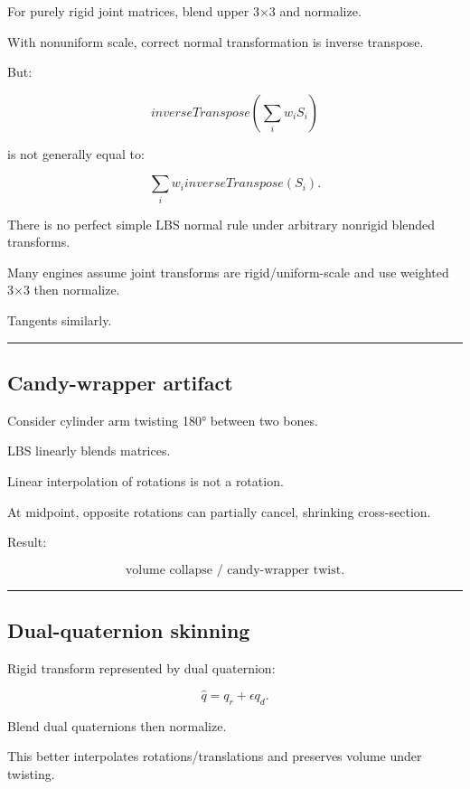 For purely rigid joint matrices, blend upper 3×3 and normalize.

With nonuniform scale, correct normal transformation is inverse transpose.

But:

\[
inverseTranspose
\left(
\sum_iw_iS_i
\right)
\]

is not generally equal to:

\[
\sum_iw_i
inverseTranspose(S_i).
\]

There is no perfect simple LBS normal rule under arbitrary nonrigid blended transforms.

Many engines assume joint transforms are rigid/uniform-scale and use weighted 3×3 then normalize.

Tangents similarly.

\begin{center}\rule{0.5\linewidth}{0.5pt}\end{center}

\subsection{Candy-wrapper artifact}\label{04-visual-computing-ii-ch041-candy-wrapper-artifact}

Consider cylinder arm twisting 180° between two bones.

LBS linearly blends matrices.

Linear interpolation of rotations is not a rotation.

At midpoint, opposite rotations can partially cancel, shrinking cross-section.

Result:

\[
\boxed{
\text{volume collapse / candy-wrapper twist}.
}
\]

\begin{center}\rule{0.5\linewidth}{0.5pt}\end{center}

\subsection{Dual-quaternion skinning}\label{04-visual-computing-ii-ch041-dual-quaternion-skinning}

Rigid transform represented by dual quaternion:

\[
\hat q=
q_r+
\epsilon q_d.
\]

Blend dual quaternions then normalize.

This better interpolates rotations/translations and preserves volume under twisting.

